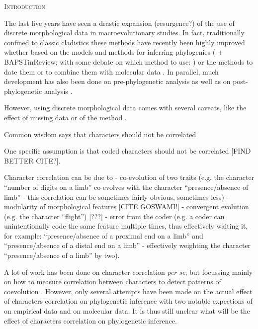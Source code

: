 \documentclass[12pt,letterpaper]{article}
\renewcommand{\section}[1]{%
\bigskip
\begin{center}
\begin{Large}
\normalfont\scshape #1
\medskip
\end{Large}
\end{center}}
\begin{document}
\section{Introduction}

The last five years have seen a drastic expansion (resurgence?) of the use of discrete morphological data in macroevolutionary studies.
In fact, traditionally confined to classic cladistics \citep{felsenstein2004inferring} these methods have recently been highly improved whether based on the models and methods for inferring phylogenies (\citealt{lewisa2001} + BAPSTinReview; with some debate on which method to use: \citealt{spencerefficacy2013,wrightbayesian2014,OReilly20160081}) or the methods to date them \citep[e.g.][]{bapsta2013} or to combine them with molecular data \citep{pyrondivergence2011,ronquista2012}.
In parallel, much development has also been done on pre-phylogenetic analysis \citep[e.g. data collection;][]{morphobank} as well as on post-phylogenetic analysis \citep[e.g. morphological disparity analysis;][]{Close2015,Claddis}.

However, using discrete morphological data comes with several caveats, like the effect of missing data \citep{Guillerme2016146} or of the method \citep{OReilly20160081}.

Common wisdom says that characters should not be correlated

One specific assumption is that coded characters should not be correlated \citep{Brazeau2011}[FIND BETTER CITE?].

Character correlation can be due to
- co-evolution of two traits (e.g. the character ``number of digits on a limb'' co-evolves with the character ``presence/absence of limb'' - this correlation can be sometimes fairly obvious, sometimes less)
- modularity of morphological features [CITE GOSWAMI!]
- convergent evolution (e.g. the character ``flight'') [???]
- error from the coder (e.g. a coder can unintentionally code the same feature multiple times, thus effectively waiting it, for example: ``presence/absence of a proximal end on a limb'' and ``presence/absence of a distal end on a limb'' - effectively weighting the character ``presence/absence of a limb'' by two).

A lot of work has been done on character correlation \textit{per se}, but focussing mainly on how to measure correlation between characters to detect patterns of coevolution \citep{Lande1983,Maddison1990,Pagel1994,Pagel2006,Grabowski2016}.
However, only several attempts have been made on the actual effect of characters correlation on phylogenetic inference with two notable expections of \cite{Davalos01072014} on empirical data and \cite{ZouConvergence} on molecular data.
It is thus still unclear what will be the effect of characters correlation on phylogenetic inference.
\end{document}
